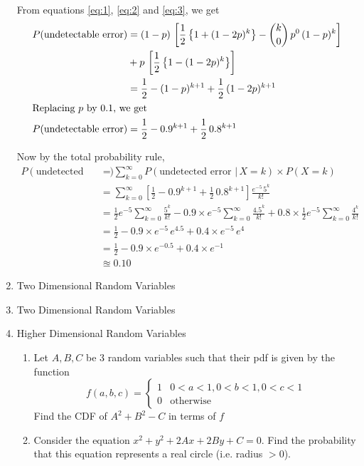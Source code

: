 \documentclass[12pt, oneside]{article}
\begin{document}
\begin{enumerate}
{    From equations \ref{eq:1}, \ref{eq:2} and \ref{eq:3}, we get
    \begin{align*}
        P(\text{undetectable error}) &= (1 - p)\,\left[\frac{1}{2}\left\{1 + (1 - 2p)^k\right\} - 
                {k \choose 0}\,p^0\,(1-p)^k\right] \\
                &+ p\,\left[\frac{1}{2}\left\{1 - (1 - 2p)^k\right\}\right] \\
            &= \frac{1}{2} - (1 - p)^{k + 1} + \frac{1}{2}\,(1 - 2p)^{k+1} \\
        \intertext{Replacing \(p\) by 0.1, we get}
        P(\text{undetectable error}) &= \frac{1}{2} - 0.9^{k + 1} + \frac{1}{2}\,0.8^{k+1}
    \end{align*}

    Now by the total probability rule,
    \begin{align*}
        P(\text{undetected error}) &= \sum_{k = 0}^{\infty} 
                        P(\text{undetected error } |\,X = k) \times P(X = k) \\
            &= \sum_{k = 0}^{\infty} 
                \left[\frac{1}{2} - 0.9^{k + 1} + \frac{1}{2}\,0.8^{k+1}\right]
                \frac{e^{-5}\,5^k}{k!} \\
            &= \frac{1}{2}e^{-5}\sum_{k = 0}^{\infty}\frac{5^k}{k!} 
               - 0.9 \times e^{-5} \sum_{k = 0}^{\infty} \frac{4.5^k}{k!}
               + 0.8 \times \frac{1}{2} e^{-5} \sum_{k = 0}^{\infty} \frac{4^k}{k!} \\
            &= \frac{1}{2} - 0.9 \times e^{-5}\,e^{4.5} + 0.4 \times e^{-5}\,e^{4} \tag*{(Using Taylor series of \(e^x\))}\\
            &= \frac{1}{2} - 0.9 \times e^{-0.5} + 0.4 \times e^{-1} \\
            &\approxeq  0.10
    \end{align*}
}

\item Two Dimensional Random Variables

\item Two Dimensional Random Variables

\item {
    Higher Dimensional Random Variables

    \begin{enumerate}
        \item Let \(A, B, C\) be 3 random variables such that their pdf is given by the function
        \[
            f(a, b, c) = \begin{cases}
                            1 & 0 < a < 1, 0 < b < 1, 0 < c < 1 \\
                            0 & \text{otherwise}
                         \end{cases}
        \]
        Find the CDF of \(A^2 + B^2 - C\) in terms of \(f\)
        \item Consider the equation \(x^2 + y^2 + 2Ax + 2By + C = 0\). Find the probability
        that this equation represents a real circle (i.e. radius \(> 0\)).
    \end{enumerate}

}
\end{enumerate}
\end{document}
